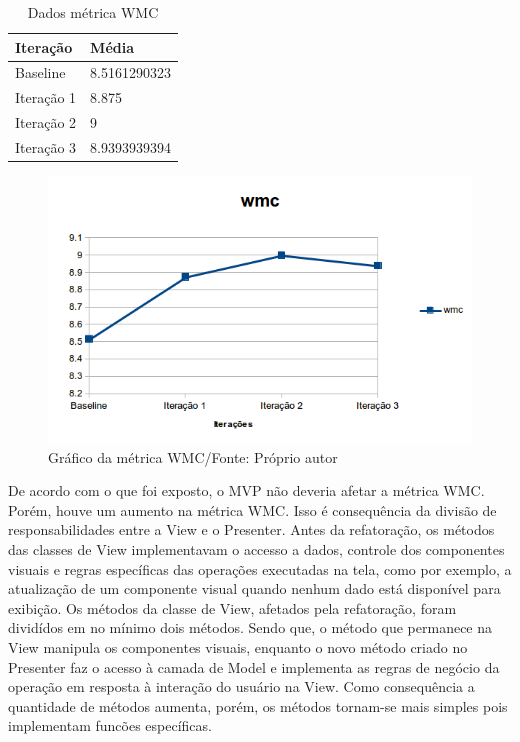 \begin{table}[h]
	\centering
	\caption{Dados métrica WMC}
    \begin{tabular}{ | l | l | }
    \hline
    Iteração & Média 			\\ \hline
    Baseline & 8.5161290323   	\\ \hline
    Iteração 1 & 8.875			\\ \hline
	Iteração 2 & 9				\\ \hline
	Iteração 3 & 8.9393939394	\\ \hline
    \end{tabular}
    
    \label{tab:wmc}
\end{table}

\begin{figure}[h]
	\centering
	\includegraphics{img/wmc.png}
	\caption{Gráfico da métrica WMC/Fonte: Próprio autor} 
	\label{fig:wmc}
\end{figure}


De acordo com o que foi exposto, o MVP não deveria afetar a métrica WMC. Porém,
houve um aumento na métrica WMC. Isso é consequência da divisão de
responsabilidades entre a View e o Presenter. Antes da refatoração, os métodos
das classes de View implementavam o accesso a dados, controle dos componentes
visuais e regras específicas das operações executadas na tela, como por exemplo,
a atualização de um componente visual quando nenhum dado está disponível para
exibição. Os métodos da classe de View, afetados pela refatoração, foram
dividídos em no mínimo dois métodos. Sendo que, o método que permanece na View
manipula os componentes visuais, enquanto o novo método criado no Presenter faz
o acesso à camada de Model e implementa as regras de negócio da operação em
resposta à interação do usuário na View. Como consequência a quantidade de
métodos aumenta, porém, os métodos tornam-se mais simples pois implementam
funcões específicas. 

